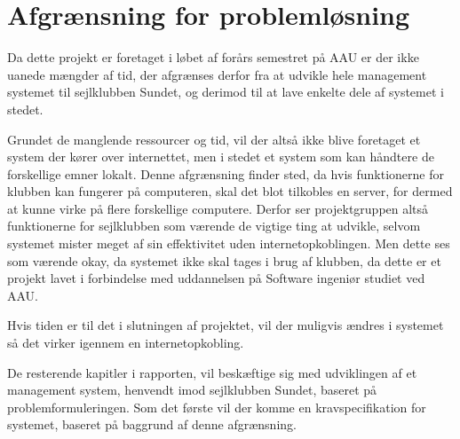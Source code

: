 \section{Afgrænsning for problemløsning}

Da dette projekt er foretaget i løbet af forårs semestret på AAU er der ikke uanede mængder af tid, der afgrænses derfor fra at udvikle hele management systemet til sejlklubben Sundet, og derimod til at lave enkelte dele af systemet i stedet. 

Grundet de manglende ressourcer og tid, vil der altså ikke blive foretaget et system der kører over internettet, men i stedet et system som kan håndtere de forskellige emner lokalt. Denne afgrænsning finder sted, da hvis funktionerne for klubben kan fungerer på computeren, skal det blot tilkobles en server, for dermed at kunne virke på flere forskellige computere. Derfor ser projektgruppen altså funktionerne for sejlklubben som værende de vigtige ting at udvikle, selvom systemet mister meget af sin effektivitet uden internetopkoblingen. Men dette ses som værende okay, da systemet ikke skal tages i brug af klubben, da dette er et projekt lavet i forbindelse med uddannelsen på Software ingeniør studiet ved AAU.

Hvis tiden er til det i slutningen af projektet, vil der muligvis ændres i systemet så det virker igennem en internetopkobling.

De resterende kapitler i rapporten, vil beskæftige sig med udviklingen af et management system, henvendt imod sejlklubben Sundet, baseret på problemformuleringen. Som det første vil der komme en kravspecifikation for systemet, baseret på baggrund af denne afgrænsning.


